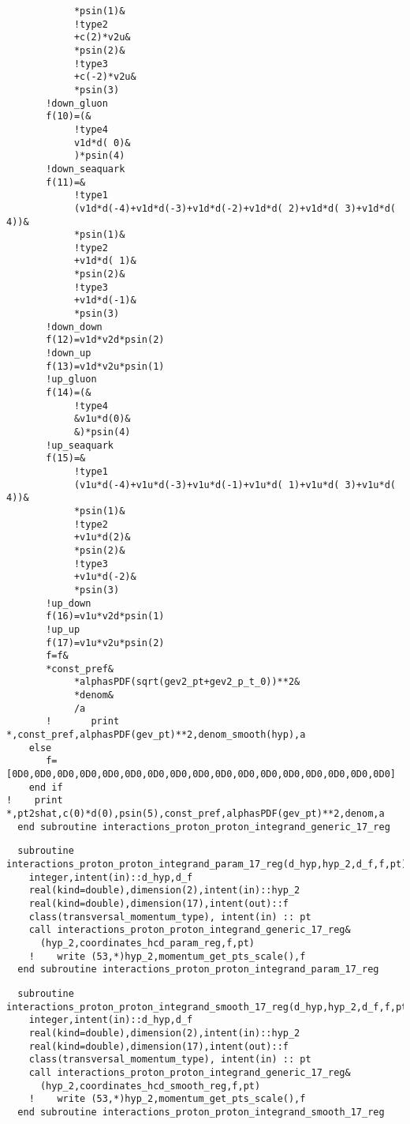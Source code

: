 \begin{Verbatim}
            *psin(1)&
            !type2
            +c(2)*v2u&
            *psin(2)&
            !type3
            +c(-2)*v2u&
            *psin(3)
       !down_gluon
       f(10)=(&
            !type4
            v1d*d( 0)&
            )*psin(4)
       !down_seaquark
       f(11)=&
            !type1
            (v1d*d(-4)+v1d*d(-3)+v1d*d(-2)+v1d*d( 2)+v1d*d( 3)+v1d*d( 4))&
            *psin(1)&
            !type2
            +v1d*d( 1)&
            *psin(2)&
            !type3
            +v1d*d(-1)&
            *psin(3)
       !down_down
       f(12)=v1d*v2d*psin(2)
       !down_up
       f(13)=v1d*v2u*psin(1)
       !up_gluon
       f(14)=(&
            !type4
            &v1u*d(0)&
            &)*psin(4)
       !up_seaquark
       f(15)=&
            !type1
            (v1u*d(-4)+v1u*d(-3)+v1u*d(-1)+v1u*d( 1)+v1u*d( 3)+v1u*d( 4))&
            *psin(1)&
            !type2
            +v1u*d(2)&
            *psin(2)&
            !type3
            +v1u*d(-2)&
            *psin(3)
       !up_down
       f(16)=v1u*v2d*psin(1)
       !up_up
       f(17)=v1u*v2u*psin(2)
       f=f&
       *const_pref&
            *alphasPDF(sqrt(gev2_pt+gev2_p_t_0))**2&
            *denom&
            /a
       !       print *,const_pref,alphasPDF(gev_pt)**2,denom_smooth(hyp),a
    else
       f=[0D0,0D0,0D0,0D0,0D0,0D0,0D0,0D0,0D0,0D0,0D0,0D0,0D0,0D0,0D0,0D0,0D0]
    end if
!    print *,pt2shat,c(0)*d(0),psin(5),const_pref,alphasPDF(gev_pt)**2,denom,a
  end subroutine interactions_proton_proton_integrand_generic_17_reg
\end{Verbatim}

\begin{Verbatim}
  subroutine interactions_proton_proton_integrand_param_17_reg(d_hyp,hyp_2,d_f,f,pt)
    integer,intent(in)::d_hyp,d_f
    real(kind=double),dimension(2),intent(in)::hyp_2
    real(kind=double),dimension(17),intent(out)::f
    class(transversal_momentum_type), intent(in) :: pt
    call interactions_proton_proton_integrand_generic_17_reg&
      (hyp_2,coordinates_hcd_param_reg,f,pt)
    !    write (53,*)hyp_2,momentum_get_pts_scale(),f
  end subroutine interactions_proton_proton_integrand_param_17_reg
\end{Verbatim}
  
\begin{Verbatim}
  subroutine interactions_proton_proton_integrand_smooth_17_reg(d_hyp,hyp_2,d_f,f,pt)
    integer,intent(in)::d_hyp,d_f
    real(kind=double),dimension(2),intent(in)::hyp_2
    real(kind=double),dimension(17),intent(out)::f
    class(transversal_momentum_type), intent(in) :: pt
    call interactions_proton_proton_integrand_generic_17_reg&
      (hyp_2,coordinates_hcd_smooth_reg,f,pt)
    !    write (53,*)hyp_2,momentum_get_pts_scale(),f
  end subroutine interactions_proton_proton_integrand_smooth_17_reg
\end{Verbatim}
